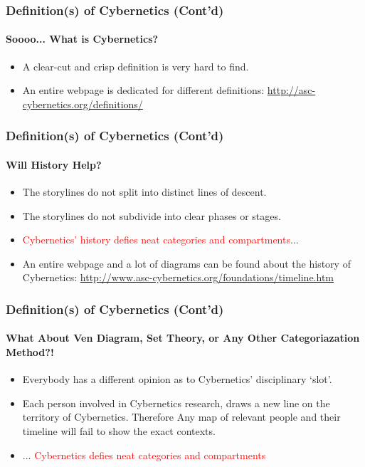 \documentclass[
	11pt,
	aspectratio=169,
]{beamer}
\begin{document}
		\begin{frame}
			\frametitle{Definition(s) of Cybernetics (Cont'd)}
			\framesubtitle{Soooo... What is Cybernetics?}
			\begin{itemize}
				\item A clear-cut and crisp definition is very hard to find.
				\item An entire webpage is dedicated for different definitions: \url{http://asc-cybernetics.org/definitions/}\\
			\end{itemize}
		\end{frame}
	
		\begin{frame}
			\frametitle{Definition(s) of Cybernetics (Cont'd)}
			\framesubtitle{Will History Help?}
			\begin{itemize}
				\item<1->The storylines do not split into distinct lines of descent.
				\item<2->The storylines do not subdivide into clear phases or stages.
				\item<3->\textcolor{red}{Cybernetics' history defies neat categories and compartments}...
				\item<4->An entire webpage and a lot of diagrams can be found about the history of Cybernetics: \url{http://www.asc-cybernetics.org/foundations/timeline.htm}
			\end{itemize}
		\end{frame}
	
		\begin{frame}
			\setbeamercovered{transparent}
			\frametitle{Definition(s) of Cybernetics (Cont'd)}
			\framesubtitle{What About Ven Diagram, Set Theory, or Any Other Categoriazation Method?!}
			\begin{itemize}
				\item<1->Everybody has a different opinion as to Cybernetics' disciplinary `slot'.
				\item<2->Each person involved in Cybernetics research, draws a new line on the territory of Cybernetics. Therefore Any map of relevant people and their timeline will fail to show the exact contexts.
				\item<3->... \textcolor{red}{Cybernetics defies neat categories and compartments}
			\end{itemize}
			\setbeamercovered{invisible}
		\end{frame}
	
\end{document}
